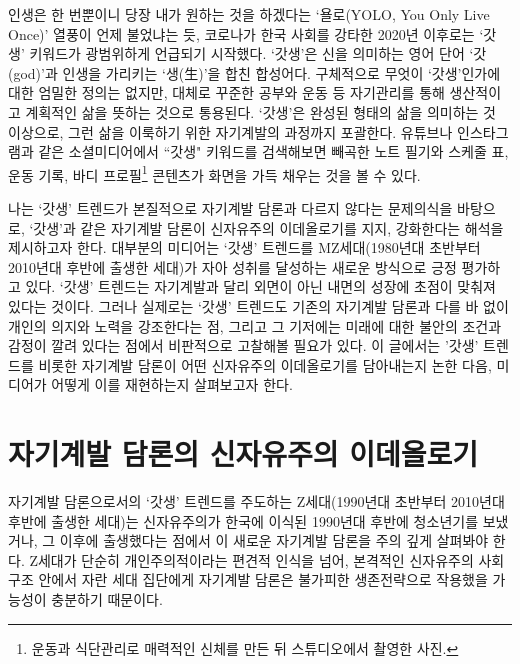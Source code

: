 \maketitle

인생은 한 번뿐이니 당장 내가 원하는 것을 하겠다는 `욜로(YOLO, You Only Live Once)' 열풍이 언제 불었냐는 듯, 코로나가 한국 사회를 강타한 2020년 이후로는 `갓생' 키워드가 광범위하게 언급되기 시작했다. `갓생'은 신을 의미하는 영어 단어 `갓(god)'과 인생을 가리키는 `생(生)'을 합친 합성어다. 구체적으로 무엇이 `갓생'인가에 대한 엄밀한 정의는 없지만, 대체로 꾸준한 공부와 운동 등 자기관리를 통해 생산적이고 계획적인 삶을 뜻하는 것으로 통용된다. `갓생'은 완성된 형태의 삶을 의미하는 것 이상으로, 그런 삶을 이룩하기 위한 자기계발의 과정까지 포괄한다. 유튜브나 인스타그램과 같은 소셜미디어에서 ``갓생" 키워드를 검색해보면 빼곡한 노트 필기와 스케줄 표, 운동 기록, 바디 프로필\footnote{운동과 식단관리로 매력적인 신체를 만든 뒤 스튜디오에서 촬영한 사진.} 콘텐츠가 화면을 가득 채우는 것을 볼 수 있다.

나는 `갓생' 트렌드가 본질적으로 자기계발 담론과 다르지 않다는 문제의식을 바탕으로, `갓생'과 같은 자기계발 담론이 신자유주의 이데올로기를 지지, 강화한다는 해석을 제시하고자 한다. 대부분의 미디어는 `갓생' 트렌드를 MZ세대(1980년대 초반부터 2010년대 후반에 출생한 세대)가 자아 성취를 달성하는 새로운 방식으로 긍정 평가하고 있다. `갓생' 트렌드는 자기계발과 달리 외면이 아닌 내면의 성장에 초점이 맞춰져 있다는 것이다. 그러나 실제로는 `갓생' 트렌드도 기존의 자기계발 담론과 다를 바 없이 개인의 의지와 노력을 강조한다는 점, 그리고 그 기저에는 미래에 대한 불안의 조건과 감정이 깔려 있다는 점\cite{csy2022}에서 비판적으로 고찰해볼 필요가 있다. 이 글에서는 '갓생' 트렌드를 비롯한 자기계발 담론이 어떤 신자유주의 이데올로기를 담아내는지 논한 다음, 미디어가 어떻게 이를 재현하는지 살펴보고자 한다.

\section*{자기계발 담론의 신자유주의 이데올로기}

자기계발 담론으로서의 `갓생' 트렌드를 주도하는 Z세대(1990년대 초반부터 2010년대 후반에 출생한 세대)는 신자유주의가 한국에 이식된 1990년대 후반에 청소년기를 보냈거나, 그 이후에 출생했다는 점에서 이 새로운 자기계발 담론을 주의 깊게 살펴봐야 한다. Z세대가 단순히 개인주의적이라는 편견적 인식을 넘어, 본격적인 신자유주의 사회 구조 안에서 자란 세대 집단에게 자기계발 담론은 불가피한 생존전략으로 작용했을 가능성이 충분하기 때문이다.

